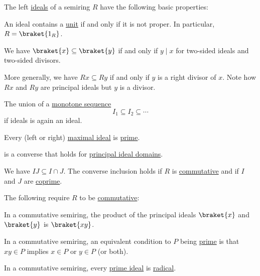 \begin{proposition}\label{thm:def:semiring_ideal/properties}
  The left \hyperref[def:semiring_ideal]{ideals} of a semiring \( R \) have the following basic properties:
  \begin{thmenum}[series=thm:def:semiring_ideal/properties]
     An ideal contains a \hyperref[def:divisibility/unit]{unit} if and only if it is not proper. In particular, \( R = \braket{ 1_R } \).

     We have \( \braket{ x } \subseteq \braket{ y } \) if and only if \( y \mid x \) for two-sided ideals and two-sided divisors.

    More generally, we have \( Rx \subseteq Ry \) if and only if \( y \) is a right divisor of \( x \). Note how \( Rx \) and \( Ry \) are  principal ideals but \( y \) is a  divisor.

     The union of a \hyperref[eq:def:partially_ordered_set/homomorphism/sequence]{monotone sequence}
    \begin{equation*}
      I_1 \subseteq I_2 \subseteq \cdots
    \end{equation*}
    if ideals is again an ideal.

     Every (left or right) \hyperref[def:semiring_ideal/maximal]{maximal ideal} is \hyperref[def:semiring_ideal/prime]{prime}.

     is a converse that holds for \hyperref[def:principal_ideal_domain]{principal ideal domains}.

     We have \( IJ \subseteq I \cap J \). The converse inclusion holds if \( R \) is \hyperref[def:semiring/commutative]{commutative} and if \( I \) and \( J \) are \hyperref[def:semiring_ideal/coprime]{coprime}.
  \end{thmenum}

  The following require \( R \) to be \hyperref[def:semiring/commutative]{commutative}:
  \begin{thmenum}[resume=thm:def:semiring_ideal/properties]
     In a commutative semiring, the product of the principal ideals \( \braket{x} \) and \( \braket{y} \) is \( \braket{xy} \).

     In a commutative semiring, an equivalent condition to \( P \) being \hyperref[def:semiring_ideal/prime]{prime} is that \( xy \in P \) implies \( x \in P \) or \( y \in P \) (or both).

     In a commutative semiring, every \hyperref[def:semiring_ideal/prime]{prime ideal} is \hyperref[def:radical_ideal]{radical}.
  \end{thmenum}
\end{proposition}
